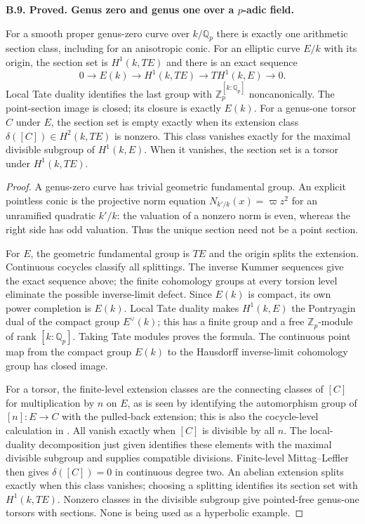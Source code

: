 \documentclass[11pt,oneside]{article}
\makeatletter
\newcounter{statementanchor}
\newenvironment{statement}[3]{%
 \refstepcounter{statementanchor}\def\@currentlabel{#1}%
 \par\addvspace{9pt}\noindent
 \textbf{#1. #2. #3.}\par\nobreak\noindent\ignorespaces
}{\par\addvspace{5pt}}
\makeatother
\begin{document}
\begin{statement}{B.9}{Proved}{Genus zero and genus one over a $p$-adic field}
\label{st:B.9}

For a smooth proper genus-zero curve over $k/\mathbb Q_p$ there is
exactly one arithmetic section class, including for an anisotropic
conic.  For an elliptic curve $E/k$ with its origin, the section set is
$H^1(k,TE)$ and there is an exact sequence
\[
 0\longrightarrow E(k)\longrightarrow H^1(k,TE)
 \longrightarrow T H^1(k,E)\longrightarrow0.
\]
Local Tate duality identifies the last group with
$\mathbb Z_p^{[k:\mathbb Q_p]}$ noncanonically.
The point-section image is closed; its closure is exactly $E(k)$.
For a genus-one torsor $C$ under $E$, the section set is empty exactly
when its extension class $\delta([C])\in H^2(k,TE)$ is nonzero.
This class vanishes exactly for the maximal divisible subgroup of
$H^1(k,E)$.  When it vanishes, the section set is a torsor under
$H^1(k,TE)$.
\end{statement}
\begin{proof}
A genus-zero curve has trivial geometric fundamental group.
An explicit pointless conic is the projective norm equation
$N_{k'/k}(x)=\varpi z^2$ for an unramified quadratic $k'/k$:
the valuation of a nonzero norm is even, whereas the right side has
odd valuation.  Thus the unique section need not be a point section.

For $E$, the geometric fundamental group is $TE$ and the origin
splits the extension.  Continuous cocycles classify all splittings.
The inverse Kummer sequences give the exact sequence above;
the finite cohomology groups at every torsion level eliminate the
possible inverse-limit defect.  Since $E(k)$ is compact, its own
power completion is $E(k)$.  Local Tate duality makes $H^1(k,E)$
the Pontryagin dual of the compact group $E^\vee(k)$; this has a
finite group and a free $\mathbb Z_p$-module of rank $[k:\mathbb Q_p]$.
Taking Tate modules proves the formula.  The continuous point map
from the compact group $E(k)$ to the Hausdorff inverse-limit
cohomology group has closed image.

For a torsor, the finite-level extension classes are the connecting
classes of $[C]$ for multiplication by $n$ on $E$, as is seen by
identifying the automorphism group of $[n]:E\to C$ with the pulled-back
extension; this is also the cocycle-level calculation in
\cite[Proposition 2.2]{B_HarariSzamuely}.  All vanish exactly
when $[C]$ is divisible by all $n$.  The local-duality decomposition
just given identifies these elements with the maximal divisible
subgroup and supplies compatible divisions.  Finite-level
Mittag--Leffler then gives $\delta([C])=0$ in continuous degree two.
An abelian extension splits exactly when this class vanishes;
choosing a splitting identifies its section set with $H^1(k,TE)$.
Nonzero classes in the divisible subgroup give pointed-free genus-one
torsors with sections.  None is being used as a hyperbolic example.
\end{proof}
\end{document}
